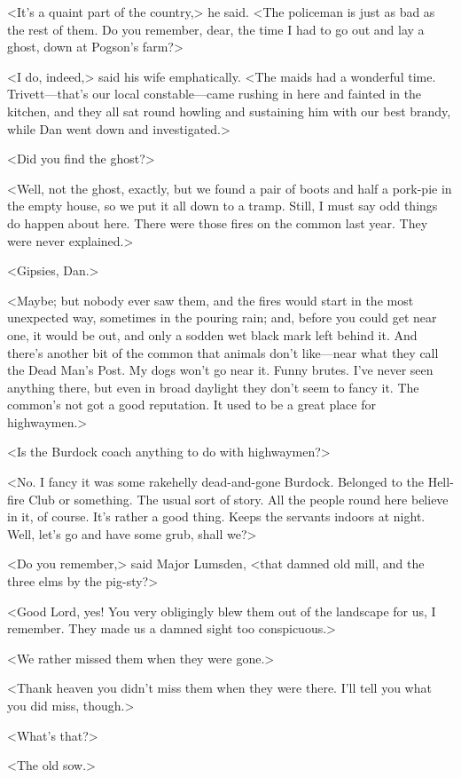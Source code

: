 <It's a quaint part of the country,> he said. <The policeman is just as bad as the rest of them. Do you remember, dear, the time I had to go out and lay a ghost, down at Pogson's farm?>

<I do, indeed,> said his wife emphatically. <The maids had a wonderful time. Trivett—that's our local constable—came rushing in here and fainted in the kitchen, and they all sat round howling and sustaining him with our best brandy, while Dan went down and investigated.>

<Did you find the ghost?>

<Well, not the ghost, exactly, but we found a pair of boots and half a pork-pie in the empty house, so we put it all down to a tramp. Still, I must say odd things do happen about here. There were those fires on the common last year. They were never explained.>

<Gipsies, Dan.>

<Maybe; but nobody ever saw them, and the fires would start in the most unexpected way, sometimes in the pouring rain; and, before you could get near one, it would be out, and only a sodden wet black mark left behind it. And there's another bit of the common that animals don't like—near what they call the Dead Man's Post. My dogs won't go near it. Funny brutes. I've never seen anything there, but even in broad daylight they don't seem to fancy it. The common's not got a good reputation. It used to be a great place for highwaymen.>

<Is the Burdock coach anything to do with highwaymen?>

<No. I fancy it was some rakehelly dead-and-gone Burdock. Belonged to the Hell-fire Club or something. The usual sort of story. All the people round here believe in it, of course. It's rather a good thing. Keeps the servants indoors at night. Well, let's go and have some grub, shall we?>

\divider
<Do you remember,> said Major Lumsden, <that damned old mill, and the three elms by the pig-sty?>

<Good Lord, yes! You very obligingly blew them out of the landscape for us, I remember. They made us a damned sight too conspicuous.>

<We rather missed them when they were gone.>

<Thank heaven you didn't miss them when they were there. I'll tell you what you did miss, though.>

<What's that?>

<The old sow.>

